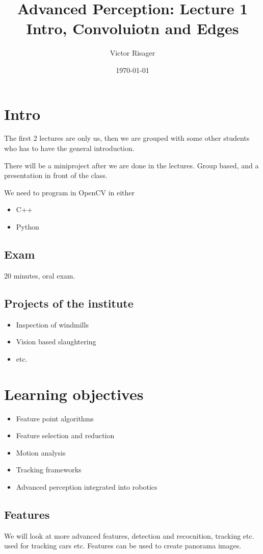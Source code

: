 \documentclass{article}
\title{Advanced Perception: Lecture 1 \\
	\large Intro, Convoluiotn and Edges
}
\author{Victor Risager}
\date{\today}
\begin{document}
\maketitle

\section{Intro}
The first 2 lectures are only us, then we are grouped with some other students who has to have the general introduction.  

There will be a miniproject after we are done in the lectures. Group based, and a presentation in front of the class. 


We need to program in OpenCV in either 
\begin{itemize}
	\item C++ 
	\item Python
\end{itemize}

\subsection{Exam}
20 minutes, oral exam.


\subsection{Projects of the institute}
\begin{itemize}
	\item Inspection of windmills
	\item Vision based slaughtering
	\item etc.
\end{itemize}

\section{Learning objectives}
\begin{itemize}
	\item Feature point algorithms
	\item Feature selection and reduction
	\item Motion analysis
	\item Tracking frameworks
	\item Advanced perception integrated into robotics
\end{itemize}

\subsection{Features}
We will look at more advanced features, detection and recocnition, tracking etc. 
used for tracking cars etc. 
Features can be used to create panorama images.
\end{document}
